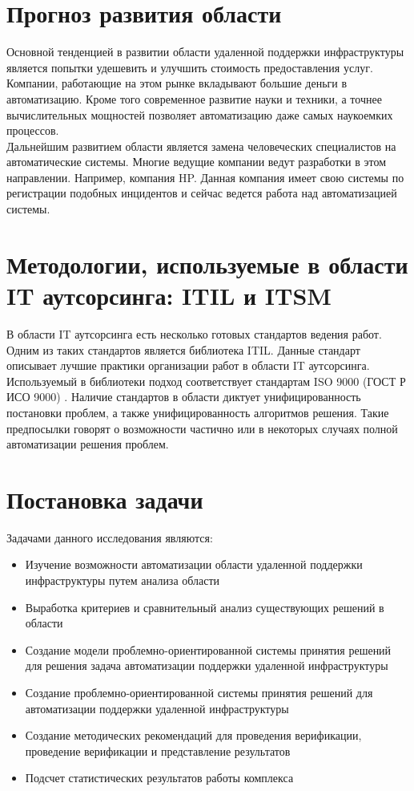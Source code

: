 \section{Прогноз развития области} \label{sect1_2}
Основной тенденцией в развитии области удаленной поддержки инфраструктуры является попытки удешевить и улучшить стоимость предоставления услуг. \\
Компании, работающие на этом рынке вкладывают большие деньги в автоматизацию. Кроме того современное развитие науки и техники, а точнее вычислительных мощностей позволяет автоматизацию даже самых наукоемких процессов. \\
Дальнейшим развитием области является замена человеческих специалистов на автоматические системы. Многие ведущие компании ведут разработки в этом направлении. Например, компания HP. Данная компания имеет свою системы по регистрации подобных инцидентов и сейчас ведется работа над автоматизацией системы. \\

\section{Методологии, используемые в области IT аутсорсинга: ITIL и ITSM} \label{sect1_3}
В области IT аутсорсинга есть несколько готовых стандартов ведения работ. Одним из таких стандартов является библиотека ITIL. Данные стандарт описывает лучшие практики организации работ в области IT аутсорсинга. Используемый в библиотеки подход соответствует стандартам ISO 9000 (ГОСТ Р ИСО 9000) .
Наличие стандартов в области диктует унифицированность постановки проблем, а также унифицированность алгоритмов решения. Такие предпосылки говорят о возможности частично или в некоторых случаях полной автоматизации решения проблем.
\section{Постановка задачи} \label{sect1_4}
Задачами данного исследования являются:
\begin{itemize}
	\item Изучение возможности автоматизации области удаленной поддержки инфраструктуры путем анализа области
	\item Выработка критериев и сравнительный анализ существующих решений в области
	\item Создание модели проблемно-ориентированной системы принятия решений для решения задача автоматизации поддержки удаленной инфраструктуры
	\item Создание проблемно-ориентированной системы принятия решений для автоматизации поддержки удаленной инфраструктуры
	\item Создание методических рекомендаций для проведения верификации, проведение верификации и представление результатов 
	\item Подсчет статистических результатов работы комплекса

\end{itemize}



\clearpage
